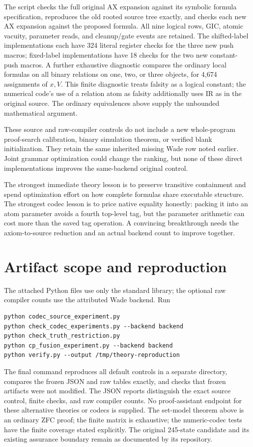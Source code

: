 \documentclass[11pt]{article}
\begin{document}
The script checks the full original AX expansion against its symbolic
formula specification, reproduces the old rooted source tree exactly,
and checks each new AX expansion against the proposed formula.  All nine
logical rows, GIC, atomic vacuity, parameter reads, and cleanup/gate events
are retained.  The shifted-label implementations each have 324 literal
register checks for the three new push macros; fixed-label implementations
have 18 checks for the two new constant-push macros.  A further exhaustive
diagnostic compares the ordinary local formulas on all binary relations on
one, two, or three objects, for 4,674 assignments of $x,V$.  This finite
diagnostic treats falsity as a logical constant; the numerical code's use
of a relation atom as falsity additionally uses IR as in the original source.
The ordinary equivalences above supply the unbounded mathematical argument.

These source and raw-compiler controls do not include a new whole-program
proof-search calibration, binary simulation theorem, or verified blank
initialization.  They retain the same inherited missing Wade row noted
earlier.  Joint grammar optimization could change the ranking, but none of
these direct implementations improves the same-backend original control.

The strongest immediate theory lesson is to preserve transitive containment
and spend optimization effort on how complete formulas share executable
structure.  The strongest codec lesson is to price native equality honestly:
packing it into an atom parameter avoids a fourth top-level tag, but the
parameter arithmetic can cost more than the saved tag operation.  A convincing
breakthrough needs the axiom-to-source reduction and an actual backend count
to improve together.

\section*{Artifact scope and reproduction}

The attached Python files use only the standard library; the optional raw
compiler counts use the attributed Wade backend.  Run
\begin{verbatim}
python codec_source_experiment.py
python check_codec_experiments.py --backend backend
python check_truth_restriction.py
python cp_fusion_experiment.py --backend backend
python verify.py --output /tmp/theory-reproduction
\end{verbatim}
The final command reproduces all default controls in a separate directory,
compares the frozen JSON and raw tables exactly, and checks that frozen
artifacts were not modified.
The JSON reports distinguish the exact source control, finite checks, and raw
compiler counts.  No proof-assistant endpoint for these alternative theories
or codecs is supplied.  The set-model theorem above is an ordinary ZFC proof;
the finite matrix is exhaustive; the numeric-codec tests have the finite
coverage stated explicitly.  The original 245-state candidate and its
existing assurance boundary remain as documented by its repository.
\end{document}
